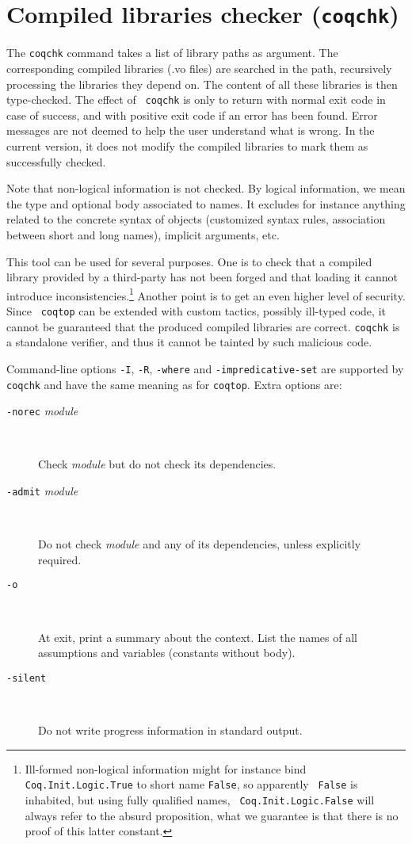 \section{Compiled libraries checker ({\tt coqchk})}

The {\tt coqchk} command takes a list of library paths as argument.
The corresponding compiled libraries (.vo files) are searched in the
path, recursively processing the libraries they depend on. The content
of all these libraries is then type-checked. The effect of {\tt
  coqchk} is only to return with normal exit code in case of success,
and with positive exit code if an error has been found. Error messages
are not deemed to help the user understand what is wrong. In the
current version, it does not modify the compiled libraries to mark
them as successfully checked.

Note that non-logical information is not checked. By logical
information, we mean the type and optional body associated to names.
It excludes for instance anything related to the concrete syntax of
objects (customized syntax rules, association between short and long
names), implicit arguments, etc.

This tool can be used for several purposes. One is to check that a
compiled library provided by a third-party has not been forged and
that loading it cannot introduce inconsistencies.\footnote{Ill-formed
  non-logical information might for instance bind {\tt
    Coq.Init.Logic.True} to short name {\tt False}, so apparently {\tt
    False} is inhabited, but using fully qualified names, {\tt
    Coq.Init.Logic.False} will always refer to the absurd proposition,
  what we guarantee is that there is no proof of this latter
  constant.}
Another point is to get an even higher level of security. Since {\tt
  coqtop} can be extended with custom tactics, possibly ill-typed
code, it cannot be guaranteed that the produced compiled libraries are
correct. {\tt coqchk} is a standalone verifier, and thus it cannot be
tainted by such malicious code.

Command-line options {\tt -I}, {\tt -R}, {\tt -where} and
{\tt -impredicative-set} are supported by {\tt coqchk} and have the
same meaning as for {\tt coqtop}. Extra options are:
\begin{description}
\item[{\tt -norec} {\em module}]\ %

  Check {\em module} but do not check its dependencies.

\item[{\tt -admit} {\em module}]\ %

  Do not check {\em module} and any of its dependencies, unless
  explicitly required.

\item[{\tt -o}]\ %

  At exit, print a summary about the context. List the names of all
  assumptions and variables (constants without body).

\item[{\tt -silent}]\ %

  Do not write progress information in standard output.
\end{description}

